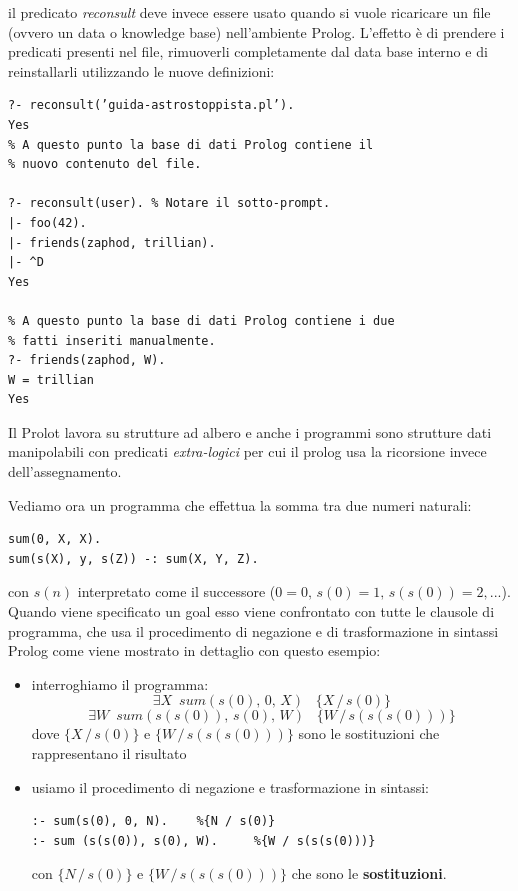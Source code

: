 \documentclass[a4paper]{report}
\begin{document}
il predicato \textit{reconsult} deve invece essere usato quando si vuole ricaricare un file (ovvero un data o knowledge base) nell'ambiente Prolog.
L’effetto è di prendere i predicati presenti nel file, rimuoverli completamente dal data base interno
e di reinstallarli utilizzando le nuove definizioni:
\begin{verbatim}
?- reconsult(’guida-astrostoppista.pl’).
Yes
% A questo punto la base di dati Prolog contiene il
% nuovo contenuto del file.

?- reconsult(user). % Notare il sotto-prompt.
|- foo(42).
|- friends(zaphod, trillian).
|- ^D
Yes

% A questo punto la base di dati Prolog contiene i due
% fatti inseriti manualmente.
?- friends(zaphod, W).
W = trillian
Yes
\end{verbatim}

Il Prolot lavora su strutture ad albero e anche i programmi sono strutture dati manipolabili con predicati \textit{extra-logici}
per cui il prolog usa la ricorsione invece dell'assegnamento.

Vediamo ora un programma che effettua la somma tra due numeri naturali:
\begin{verbatim}
sum(0, X, X).
sum(s(X), y, s(Z)) -: sum(X, Y, Z).
\end{verbatim}
con $s(n)$ interpretato come il successore ($0=0,\, s(0)=1, \,s(s(0))=2,... $).\newline
Quando viene specificato un goal esso viene confrontato con tutte le clausole di programma, che usa il procedimento di negazione
e di trasformazione in sintassi Prolog come viene mostrato in dettaglio con questo esempio:
\begin{itemize}
\item  interroghiamo il programma:
$$\exists X\,\,\, sum(s(0),\, 0,\, X)\,\,\,\,\,\{X\,/\, s(0)\}$$
$$\exists W\,\,\, sum(s(s(0)),\, s(0), \, W)\,\,\,\,\,\{W\,/\, s(s(s(0)))\}$$
dove $\{X\,/\, s(0)\}$ e $\{W\,/\, s(s(s(0)))\}$ sono le sostituzioni che rappresentano il risultato
\item usiamo il procedimento di negazione e trasformazione in sintassi:
\begin{verbatim}
:- sum(s(0), 0, N).    %{N / s(0)}
:- sum (s(s(0)), s(0), W).     %{W / s(s(s(0)))}
\end{verbatim}
con $\{N\, /\, s(0)\}$ e $\{W \,/\, s(s(s(0)))\}$ che sono le \textbf{sostituzioni}.
\end{itemize}
\end{document}
